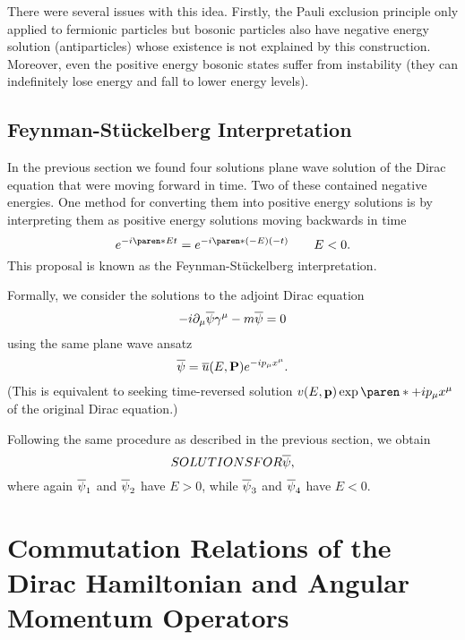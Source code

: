 \documentclass[11pt]{penrose}
\def\apsi{\qbar{\psi}}
\begin{document}
There were several issues with this idea. Firstly, the Pauli exclusion principle only applied to fermionic particles but bosonic particles also have negative energy solution (antiparticles) whose existence is not explained by this construction. Moreover, even the positive energy bosonic states suffer from instability (they can indefinitely lose energy and fall to lower energy levels).

\subsection{Feynman-St{\"u}ckelberg Interpretation}
In the previous section we found four solutions plane wave solution of the Dirac equation that were moving forward in time. Two of these contained negative energies. One method for converting them into positive energy solutions is by interpreting them as positive energy solutions moving backwards in time
\begin{equation}
    e^{-i\paren*{Et}} = e^{-i\paren*{(-E)(-t)}}
    \qquad E < 0.
\end{equation}
This proposal is known as the Feynman-St{\"u}ckelberg interpretation.

Formally, we consider the solutions to the adjoint Dirac equation
\begin{equation}
    -i \pd_\mu \apsi \gamma^\mu - m\apsi = 0
\end{equation}
using the same plane wave ansatz
\begin{equation}
    \apsi = \qbar{u}(E, \vec{P}) e^{-i p_\mu x^\mu}.
\end{equation}
(This is equivalent to seeking time-reversed solution $v(E, \vec{p})\exp\paren*{+ip_\mu x^\mu}$ of the original Dirac equation.)

Following the same procedure as described in the previous section, we obtain
\begin{equation}
    SOLUTIONS FOR \apsi,
\end{equation}
where again $\apsi_1$ and $\apsi_2$ have $E > 0$, while $\apsi_3$ and $\apsi_4$ have $E < 0$.


\appendix
\section{Commutation Relations of the Dirac Hamiltonian and Angular Momentum Operators}
\end{document}
